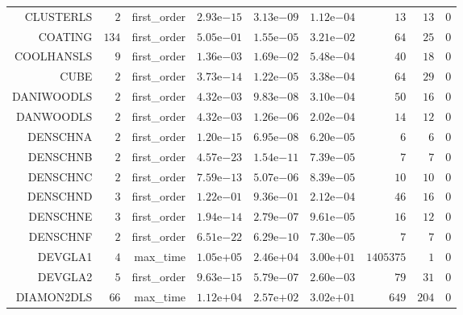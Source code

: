 \begin{longtable}{rrrrrrrrr}
CLUSTERLS & \(     2\) & first\_order & \( 2.93\)e\(-15\) & \( 3.13\)e\(-09\) & \( 1.12\)e\(-04\) & \(    13\) & \(    13\) & \(     0\) \\
COATING & \(   134\) & first\_order & \( 5.05\)e\(-01\) & \( 1.55\)e\(-05\) & \( 3.21\)e\(-02\) & \(    64\) & \(    25\) & \(     0\) \\
COOLHANSLS & \(     9\) & first\_order & \( 1.36\)e\(-03\) & \( 1.69\)e\(-02\) & \( 5.48\)e\(-04\) & \(    40\) & \(    18\) & \(     0\) \\
CUBE & \(     2\) & first\_order & \( 3.73\)e\(-14\) & \( 1.22\)e\(-05\) & \( 3.38\)e\(-04\) & \(    64\) & \(    29\) & \(     0\) \\
DANIWOODLS & \(     2\) & first\_order & \( 4.32\)e\(-03\) & \( 9.83\)e\(-08\) & \( 3.10\)e\(-04\) & \(    50\) & \(    16\) & \(     0\) \\
DANWOODLS & \(     2\) & first\_order & \( 4.32\)e\(-03\) & \( 1.26\)e\(-06\) & \( 2.02\)e\(-04\) & \(    14\) & \(    12\) & \(     0\) \\
DENSCHNA & \(     2\) & first\_order & \( 1.20\)e\(-15\) & \( 6.95\)e\(-08\) & \( 6.20\)e\(-05\) & \(     6\) & \(     6\) & \(     0\) \\
DENSCHNB & \(     2\) & first\_order & \( 4.57\)e\(-23\) & \( 1.54\)e\(-11\) & \( 7.39\)e\(-05\) & \(     7\) & \(     7\) & \(     0\) \\
DENSCHNC & \(     2\) & first\_order & \( 7.59\)e\(-13\) & \( 5.07\)e\(-06\) & \( 8.39\)e\(-05\) & \(    10\) & \(    10\) & \(     0\) \\
DENSCHND & \(     3\) & first\_order & \( 1.22\)e\(-01\) & \( 9.36\)e\(-01\) & \( 2.12\)e\(-04\) & \(    46\) & \(    16\) & \(     0\) \\
DENSCHNE & \(     3\) & first\_order & \( 1.94\)e\(-14\) & \( 2.79\)e\(-07\) & \( 9.61\)e\(-05\) & \(    16\) & \(    12\) & \(     0\) \\
DENSCHNF & \(     2\) & first\_order & \( 6.51\)e\(-22\) & \( 6.29\)e\(-10\) & \( 7.30\)e\(-05\) & \(     7\) & \(     7\) & \(     0\) \\
DEVGLA1 & \(     4\) & max\_time & \( 1.05\)e\(+05\) & \( 2.46\)e\(+04\) & \( 3.00\)e\(+01\) & \(1405375\) & \(     1\) & \(     0\) \\
DEVGLA2 & \(     5\) & first\_order & \( 9.63\)e\(-15\) & \( 5.79\)e\(-07\) & \( 2.60\)e\(-03\) & \(    79\) & \(    31\) & \(     0\) \\
DIAMON2DLS & \(    66\) & max\_time & \( 1.12\)e\(+04\) & \( 2.57\)e\(+02\) & \( 3.02\)e\(+01\) & \(   649\) & \(   204\) & \(     0\) \\

\end{longtable}

